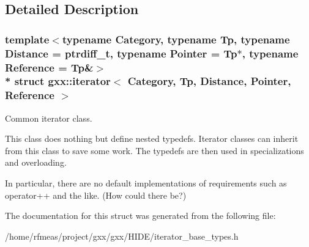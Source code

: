 \subsection{Detailed Description}
\subsubsection*{template$<$typename Category, typename Tp, typename Distance = ptrdiff\+\_\+t, typename Pointer = Tp$\ast$, typename Reference = Tp\&$>$\\*
struct gxx\+::iterator$<$ Category, Tp, Distance, Pointer, Reference $>$}

Common iterator class. 

This class does nothing but define nested typedefs. Iterator classes can inherit from this class to save some work. The typedefs are then used in specializations and overloading.

In particular, there are no default implementations of requirements such as {\ttfamily operator++} and the like. (How could there be?) 

The documentation for this struct was generated from the following file\+:\begin{DoxyCompactItemize}
\item 
/home/rfmeas/project/gxx/gxx/\+H\+I\+D\+E/iterator\+\_\+base\+\_\+types.\+h\end{DoxyCompactItemize}
